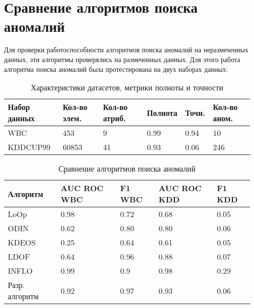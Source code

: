 \section{Сравнение  алгоритмов поиска аномалий}
Для проверки работоспособности алгоритмов поиска аномалий на неразмеченных данных, эти алгоритмы проверялись на размеченных данных.
Для этого работа алгоритма поиска аномалий была протестирована на двух наборах данных:
\begin{table}[!h]
	
	\caption{\label{tab:issled1}Характеристики датасетов, метрики полноты и точности}
	
	\begin{center}
		
		\begin{tabular}{|l|l|l|l|l|l|}
			
			\hline
			
			Набор данных& Кол-во элем. & Кол-во атриб. &  Полнота & Точн.& Кол-во аном.  \\
			
			\hline 
			
			WBC& 453 & 9 & 0.99&0.94 & 10  \\
			
			\hline
			KDDCUP99 & 60853 & 41 & 0.93&0.06 & 246  \\
			\hline
		
			
		\end{tabular}
		
	\end{center}
	
\end{table}
\begin{table}[h]
	
	\caption{\label{tab:issled2}Сравнение  алгоритмов поиска аномалий}
	
	\begin{center}
		
		\begin{tabular}{|l|l|l|l|l|}
			
			\hline
			
			Алгоритм & AUC ROC WBC & F1 WBC &  AUC ROC KDD & F1 KDD \\
			
			\hline 
			
			LoOp& 0.98 & 0.72 & 0.68& 0.05  \\
			
			\hline
			ODIN & 0.62 & 0.80 & 0.80& 0.06  \\
			
			\hline 
			KDEOS & 0.25	 & 0.64 & 0.61& 0.05  \\
			
			\hline 
			LDOF & 0.64	 & 0.96 & 0.88&0.07  \\
			\hline 
			INFLO & 0.99	 & 0.9 & 0.98&0.29  \\
			\hline   
			Разр. алгоритм & 0.92	 & 0.97 & 0.93 & 0.06  \\
			
			\hline  
			
		\end{tabular}
		
	\end{center}
	
\end{table}

